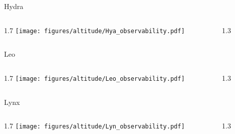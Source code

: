 \documentclass[final]{beamer}
\newlength{\colwidth}
\begin{document}
\begin{frame}[t]{}

    \Large{Hydra}
    \begin{columns}[T]
        \begin{column}{1.7\colwidth}
            \centering
            \texttt{[image: figures/altitude/Hya\_observability.pdf]}
        \end{column}
        \begin{column}{1.3\colwidth}
            \Large
            
        \end{column}
    \end{columns}

    \Large{Leo}
    \begin{columns}[T]
        \begin{column}{1.7\colwidth}
            \centering
            \texttt{[image: figures/altitude/Leo\_observability.pdf]}
        \end{column}
        \begin{column}{1.3\colwidth}
            \Large
            
        \end{column}
    \end{columns}

    \Large{Lynx}
    \begin{columns}[T]
        \begin{column}{1.7\colwidth}
            \centering
            \texttt{[image: figures/altitude/Lyn\_observability.pdf]}
        \end{column}
        \begin{column}{1.3\colwidth}
            \Large
            
        \end{column}
    \end{columns}
\end{frame}

\end{document}
